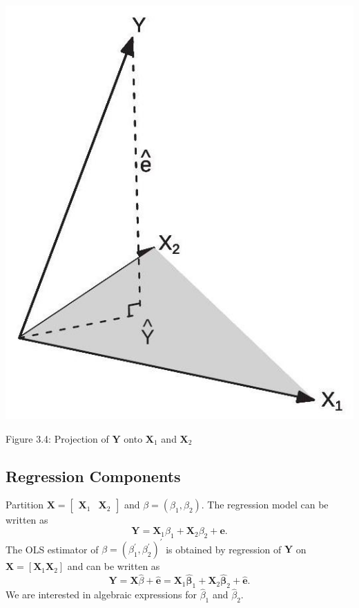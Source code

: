 \documentclass[10pt]{article}
\begin{document}
\includegraphics[max width=\textwidth]{2022_09_17_333a3ece3fb3afcc15d0g-17}

Figure 3.4: Projection of $\boldsymbol{Y}$ onto $\boldsymbol{X}_{1}$ and $\boldsymbol{X}_{2}$

\subsection{Regression Components}
Partition $\boldsymbol{X}=\left[\begin{array}{ll}\boldsymbol{X}_{1} & \boldsymbol{X}_{2}\end{array}\right]$ and $\beta=\left(\beta_{1}, \beta_{2}\right)$. The regression model can be written as
$$
\boldsymbol{Y}=\boldsymbol{X}_{1} \beta_{1}+\boldsymbol{X}_{2} \beta_{2}+\boldsymbol{e} .
$$
The OLS estimator of $\beta=\left(\beta_{1}^{\prime}, \beta_{2}^{\prime}\right)^{\prime}$ is obtained by regression of $\boldsymbol{Y}$ on $\boldsymbol{X}=\left[\boldsymbol{X}_{1} \boldsymbol{X}_{2}\right]$ and can be written as
$$
\boldsymbol{Y}=\boldsymbol{X} \widehat{\beta}+\widehat{\boldsymbol{e}}=\boldsymbol{X}_{1} \widehat{\boldsymbol{\beta}}_{1}+\boldsymbol{X}_{2} \widehat{\boldsymbol{\beta}}_{2}+\widehat{\boldsymbol{e}} .
$$
We are interested in algebraic expressions for $\widehat{\beta}_{1}$ and $\widehat{\beta}_{2}$.
\end{document}
